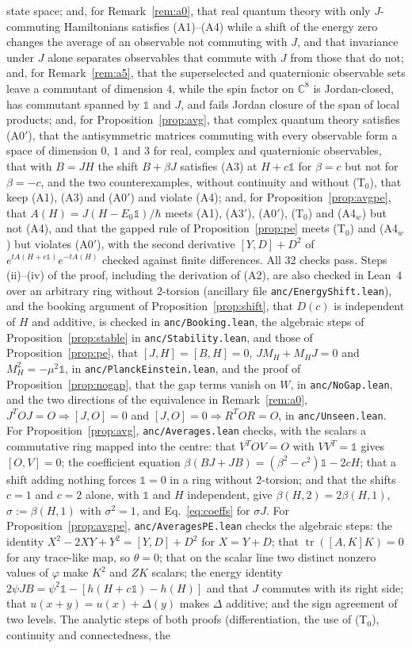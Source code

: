 \documentclass[11pt]{article}
\theoremstyle{remark}
\newcommand{\C}{\mathbb{C}}
\newcommand{\one}{\mathbb{1}}
\newcommand{\tr}{\operatorname{tr}}
\begin{document}
state space; and, for Remark~\ref{rem:a0}, that real quantum theory with only $J$-commuting Hamiltonians satisfies (A1)--(A4) while a shift of the energy zero changes the average of an observable not commuting with $J$, and that invariance under $J$ alone separates observables that commute with $J$ from those that do not; and, for Remark~\ref{rem:a5}, that the superselected and quaternionic observable sets leave a commutant of dimension $4$, while the spin factor on $\C^8$ is Jordan-closed, has commutant spanned by $\one$ and $J$, and fails Jordan closure of the span of local products; and, for Proposition~\ref{prop:avg}, that complex quantum theory satisfies (A0$'$), that the antisymmetric matrices commuting with every observable form a space of dimension $0$, $1$ and $3$ for real, complex and quaternionic observables, that with $B=JH$ the shift $B+\beta J$ satisfies (A3) at $H+c\one$ for $\beta=c$ but not for $\beta=-c$, and the two counterexamples, without continuity and without (T$_0$), that keep (A1), (A3) and (A0$'$) and violate (A4); and, for Proposition~\ref{prop:avgpe}, that $A(H)=J(H-E_0\one)/\hbar$ meets (A1), (A3$'$), (A0$'$), (T$_0$) and (A4$_w$) but not (A4), and that the gapped rule of Proposition~\ref{prop:pe} meets (T$_0$) and (A4$_w$) but violates (A0$'$), with the second derivative $[Y,D]+D^2$ of $e^{tA(H+c\one)}e^{-tA(H)}$ checked against finite differences. All 32 checks pass. Steps (ii)--(iv) of the proof, including the derivation of (A2), are also checked in Lean~4 over an arbitrary ring without 2-torsion (ancillary file \texttt{anc/EnergyShift.lean}), and the booking argument of Proposition~\ref{prop:shift}, that $D(c)$ is independent of $H$ and additive, is checked in \texttt{anc/Booking.lean}, the algebraic steps of Proposition~\ref{prop:stable} in \texttt{anc/Stability.lean}, and those of Proposition~\ref{prop:pe}, that $[J,H]=[B,H]=0$, $JM_H+M_HJ=0$ and $M_H^2=-\mu^2\one$, in \texttt{anc/PlanckEinstein.lean}, and the proof of Proposition~\ref{prop:nogap}, that the gap terms vanish on $W$, in \texttt{anc/NoGap.lean}, and the two directions of the equivalence in Remark~\ref{rem:a0}, $J^TOJ=O\Rightarrow[J,O]=0$ and $[J,O]=0\Rightarrow R^TOR=O$, in \texttt{anc/Unseen.lean}. For Proposition~\ref{prop:avg}, \texttt{anc/Averages.lean} checks, with the scalars a commutative ring mapped into the centre: that $V^TOV=O$ with $VV^T=\one$ gives $[O,V]=0$; the coefficient equation $\beta(BJ+JB)=(\beta^2-c^2)\one-2cH$; that a shift adding nothing forces $\one=0$ in a ring without 2-torsion; and that the shifts $c=1$ and $c=2$ alone, with $\one$ and $H$ independent, give $\beta(H,2)=2\beta(H,1)$, $\sigma:=\beta(H,1)$ with $\sigma^2=1$, and Eq.~\eqref{eq:coeffs} for $\sigma J$. For Proposition~\ref{prop:avgpe}, \texttt{anc/AveragesPE.lean} checks the algebraic steps: the identity $X^2-2XY+Y^2=[Y,D]+D^2$ for $X=Y+D$; that $\tr([A,K]K)=0$ for any trace-like map, so $\theta=0$; that on the scalar line two distinct nonzero values of $\varphi$ make $K^2$ and $ZK$ scalars; the energy identity $2\psi JB=\psi^2\one-[h(H+c\one)-h(H)]$ and that $J$ commutes with its right side; that $u(x+y)=u(x)+\Delta(y)$ makes $\Delta$ additive; and the sign agreement of two levels. The analytic steps of both proofs (differentiation, the use of (T$_0$), continuity and connectedness, the 
\end{document}
